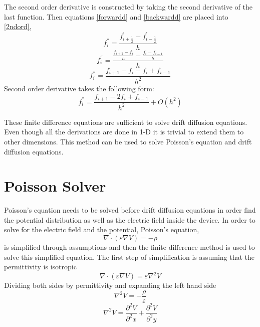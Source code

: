 \begin{doublespace}
The second order derivative is constructed by taking the second derivative of the last function. Then equations \ref{forwardd} and \ref{backwardd} are placed into \ref{2ndord},
\begin{equation}\nonumber
f^{''}_{i}=\frac{f_{i+\frac{1}{2}}^{'}-f_{i-\frac{1}{2}}^{'}}{h}
\end{equation}
\begin{equation}\nonumber
f^{''}_{i}=\frac{\frac{f_{i+1}-f_{i}}{h}-\frac{f_{i}-f_{i-1}}{h}}{h}
\end{equation}
\begin{equation}\nonumber
f^{''}_{i}=\frac{f_{i+1}-f_{i}-f_{i}+f_{i-1}}{h^2}
\end{equation}
Second order derivative  takes the following form:
\begin{equation}
f^{''}_{i}=\frac{f_{i+1}-2f_{i}+f_{i-1}}{h^2}+O(h^2)
\label{fdc2}
\end{equation}

These finite difference equations are sufficient to solve drift diffusion equations. Even though all the derivations are done in 1-D it is trivial to extend them to other dimensions. This method can be used to solve Poisson's equation and drift diffusion equations.
\clearpage

\section{Poisson Solver}

Poisson's equation needs to be solved before drift diffusion equations in order find the potential distribution as well as the electric field inside the device. In order to solve for the electric field and the potential, Poisson's equation,
\begin{equation}
\nabla \cdot  (\varepsilon \nabla V)=-\rho
\label{Poissons2}
\end{equation}
is simplified through assumptions and then the finite difference method is used to solve this simplified equation\cite{smith1985numerical}. The first step of simplification is assuming that the permittivity is isotropic 
\begin{equation}
\nabla \cdot  (\varepsilon \nabla V)=\varepsilon  \nabla^2 V
\end{equation}
Dividing both sides  by  permittivity and expanding the left hand side 
\begin{equation}
 \nabla^2 V =-\frac{\rho}{\varepsilon}
 \label{Poissons}
\end{equation}
\begin{equation}
 \nabla^2 V =\frac{\partial^2 V}{\partial^2 x}+\frac{\partial^2 V}{\partial^2 y}
\end{equation}


\end{doublespace}
